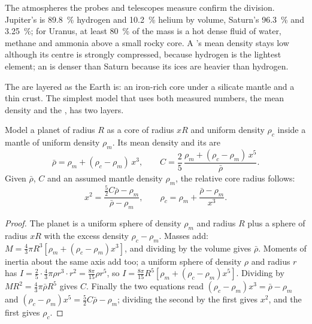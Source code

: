 The atmospheres the probes and telescopes measure confirm the division.
Jupiter's is \qty{89.8}{\percent} hydrogen and \qty{10.2}{\percent} helium
by volume, Saturn's \qty{96.3}{\percent} and \qty{3.25}{\percent}; for
Uranus, at least \qty{80}{\percent} of the mass is a hot dense fluid of
water, methane and ammonia above a small rocky core. A 's mean
density stays low although its centre is strongly compressed, because hydrogen is the lightest element; an  is
denser than Saturn because its ices are heavier than hydrogen.

The  are layered as the Earth is: an iron-rich core
under a silicate mantle and a thin crust. The simplest model that uses both
measured numbers, the mean density and the , has
two layers.

\begin{proposition}\label{prop:b1:comparative-planetology:two-layer}
Model a planet of radius $R$ as a core of radius $xR$ and uniform density
$\rho_c$ inside a mantle of uniform density $\rho_m$. Its mean density and
its  are
\[
  \bar\rho = \rho_m + (\rho_c - \rho_m)\,x^3 , \qquad
  C = \frac25\,\frac{\rho_m + (\rho_c - \rho_m)\,x^5}{\bar\rho} .
\]
Given $\bar\rho$, $C$ and an assumed mantle density $\rho_m$, the relative
core radius follows:
\[
  x^2 = \frac{\tfrac52C\bar\rho - \rho_m}{\bar\rho - \rho_m} ,
  \qquad \rho_c = \rho_m + \frac{\bar\rho - \rho_m}{x^3} .
\]
\end{proposition}

\begin{proof}
The planet is a uniform sphere of density $\rho_m$ and radius $R$ plus a
sphere of radius $xR$ with the excess density $\rho_c - \rho_m$. Masses add:
$M = \tfrac43\pi R^3[\rho_m + (\rho_c - \rho_m)x^3]$, and dividing by the
volume gives $\bar\rho$. Moments of inertia about the same axis add too; a
uniform sphere of density $\rho$ and radius $r$ has
$I = \tfrac25\cdot\tfrac43\pi\rho r^3\cdot r^2 = \tfrac{8\pi}{15}\rho r^5$,
so $I = \tfrac{8\pi}{15}R^5[\rho_m + (\rho_c - \rho_m)x^5]$. Dividing by
$MR^2 = \tfrac43\pi\bar\rho R^5$ gives $C$. Finally the two equations read
$(\rho_c - \rho_m)x^3 = \bar\rho - \rho_m$ and $(\rho_c - \rho_m)x^5 =
\tfrac52C\bar\rho - \rho_m$; dividing the second by the first gives $x^2$,
and the first gives $\rho_c$.
\end{proof}

